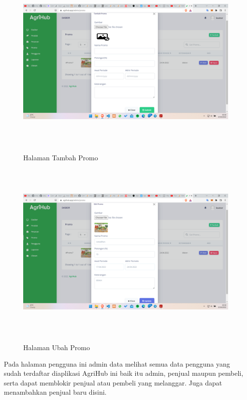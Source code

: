 \begin{enumerate}
\begin{enumerate}
			\begin{figure}[H]
				\centering
				{\includegraphics [width = 14.3cm, height= 9cm]{gambar/admin/tambah_promo}}
				\caption{Halaman Tambah Promo}
				\label{tambah_promo}
			\end{figure}

			\begin{figure}[H]
				\centering
				{\includegraphics [width = 14.3cm, height= 9cm]{gambar/admin/ubah_promo}}
				\caption{Halaman Ubah Promo}
				\label{ubah_promo}
			\end{figure}

			\par Pada halaman pengguna ini admin data melihat semua data pengguna yang sudah terdaftar diaplikasi AgriHub ini baik itu admin, penjual maupun pembeli, serta dapat memblokir penjual atau pembeli yang melanggar. Juga dapat menambahkan penjual baru disini.


\end{enumerate}
\end{enumerate}

